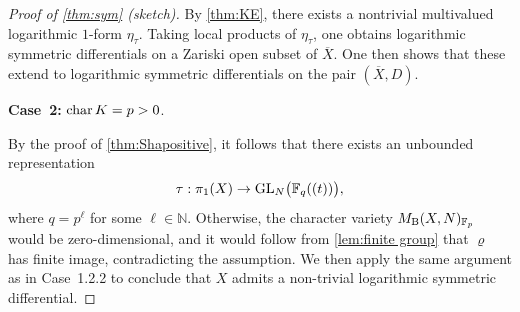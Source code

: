 \documentclass[english]{amsproc}
\theoremstyle{plain}
\theoremstyle{definition}
\theoremstyle{remark}
\theoremstyle{plain}
\numberwithin{equation}{thm} %
\newcommand{\bF}{\mathbb{F}}
\newcommand{\bN}{\mathbb{N}}
\newcommand{\GL}{{\rm GL}}
\begin{document}
\begin{proof}[Proof  of \cref{thm:sym} (sketch)]
By \cref{thm:KE}, there exists a nontrivial multivalued logarithmic \(1\)-form \(\eta_{\tau}\).
Taking local products of \(\eta_{\tau}\), one obtains logarithmic symmetric differentials on a 
Zariski open subset of \(\overline{X}\).
One then shows that these extend to logarithmic symmetric differentials on the pair 
\((\overline{X}, D)\).
	
	\medskip
	
	\noindent\textbf{Case~2:} ${\rm char}\, K = p>0$.
	
	By the proof of \cref{thm:Shapositive}, it follows that there exists an unbounded
	representation
	\[
	\tau:\pi_1(X)\to \GL_N\bigl(\bF_q((t))\bigr),
	\]
	where $q=p^\ell$ for some $\ell\in \bN$. Otherwise, the character variety
	$M_{\rm B}(X,N)_{\bF_p}$ would be zero-dimensional, and it would follow from
	\cref{lem:finite group} that $\varrho$ has finite image, contradicting the assumption.
	We then apply the same argument as in  {Case~1.2.2} to conclude that $X$
	admits a non-trivial logarithmic symmetric differential.
\end{proof}
\end{document}
